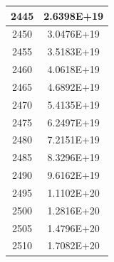 \documentclass[a4paper]{article}
\begin{document}
\begin{tabular}{|c|c|}
		\hline
		2445 & 2.6398E+19 \\
		\hline
		2450 & 3.0476E+19 \\
		\hline
		2455 & 3.5183E+19 \\
		\hline
		2460 & 4.0618E+19 \\
		\hline
		2465 & 4.6892E+19 \\
		\hline
		2470 & 5.4135E+19 \\
		\hline
		2475 & 6.2497E+19 \\
		\hline
		2480 & 7.2151E+19 \\
		\hline
		2485 & 8.3296E+19 \\
		\hline
		2490 & 9.6162E+19 \\
		\hline
		2495 & 1.1102E+20 \\
		\hline
		2500 & 1.2816E+20 \\
		\hline
		2505 & 1.4796E+20 \\
		\hline
		2510 & 1.7082E+20 \\
		\hline
	\end{tabular}
	\hfill
\end{document}

